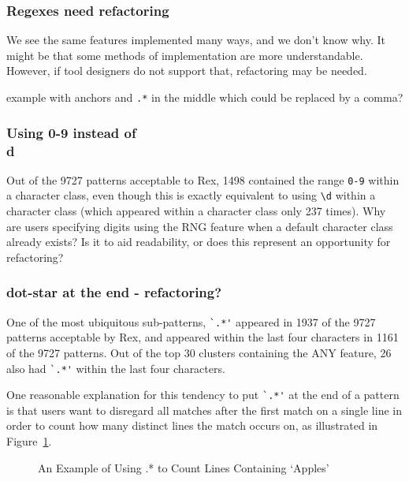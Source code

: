 \subsubsection{Regexes need refactoring}
We see the same features implemented many ways, and we don't know why. It might be that some methods of implementation are more understandable. However, if tool designers do not support that, refactoring may be needed.

example with anchors and {\tt .*} in the middle which could be replaced by a comma?

\subsubsection{Using 0-9 instead of \\d}
Out of the 9727 patterns acceptable to Rex, 1498 contained the range \verb•0-9• within a character class, even though this is exactly equivalent to using \verb•\d• within a character class (which appeared within a character class only 237 times).  Why are users specifying digits using the RNG feature when a default character class already exists?  Is it to aid readability, or does this represent an opportunity for refactoring?

\subsubsection{dot-star at the end - refactoring?}
One of the most ubiquitous sub-patterns, \verb!`.*'! appeared in 1937 of the 9727 patterns acceptable by Rex, and appeared within the last four characters in 1161 of the 9727 patterns.  Out of the top 30 clusters containing the ANY feature, 26 also had \verb!`.*'! within the last four characters.

One reasonable explanation for this tendency to put \verb!`.*'! at the end of a pattern is that users want to disregard all matches after the first match on a single line in order to count how many distinct lines the match occurs on, as illustrated in Figure~\ref{fig:lineSearch}.

\begin{figure}[tb]
\centering
{}
\caption{An Example of Using .* to Count Lines Containing `Apples'}
\label{fig:lineSearch}
\end{figure}

